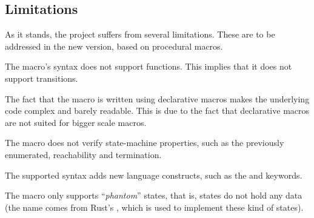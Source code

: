 \subsection{Limitations}

As it stands, the project suffers from several limitations.
These are to be addressed in the new version, based on procedural macros.
\begin{compactitem}
    \item The macro's syntax does not support functions. This implies that it does not support transitions.
    \item The fact that the macro is written using declarative macros makes the underlying code complex and barely readable.
    This is due to the fact that declarative macros are not suited for bigger scale macros.
    \item The macro does not verify state-machine properties, such as the previously enumerated, reachability and termination.
    \item The supported syntax adds new language constructs, such as the  and  keywords.
    \item The macro only supports “\emph{phantom}” states, that is, states do not hold any data
    (the name comes from Rust's , which is used to implement these kind of states).
\end{compactitem}
